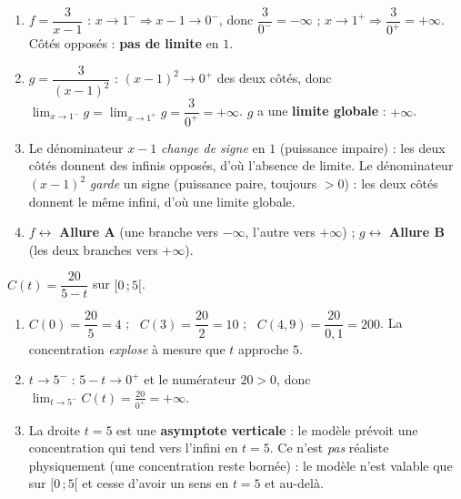 \documentclass[11pt,a4paper]{article}
\begin{document}
\begin{correction}
\begin{enumerate}[label=\alph*),leftmargin=2em,itemsep=3pt]
  \item $f=\dfrac{3}{x-1}$ : $x\to 1^{-}\Rightarrow x-1\to 0^{-}$, donc $\dfrac{3}{0^{-}}=-\infty$ ;
        $x\to 1^{+}\Rightarrow \dfrac{3}{0^{+}}=+\infty$. Côtés opposés : \textbf{pas de limite} en $1$.
  \item $g=\dfrac{3}{(x-1)^2}$ : $(x-1)^2\to 0^{+}$ des deux côtés, donc
        $\displaystyle\lim_{x\to 1^{-}} g=\lim_{x\to 1^{+}} g=\dfrac{3}{0^{+}}=+\infty$. $g$ a une
        \textbf{limite globale} : $+\infty$.
  \item Le dénominateur $x-1$ \emph{change de signe} en $1$ (puissance impaire) : les deux côtés donnent des
        infinis opposés, d'où l'absence de limite. Le dénominateur $(x-1)^2$ \emph{garde} un signe
        (puissance paire, toujours $>0$) : les deux côtés donnent le même infini, d'où une limite globale.
  \item $f\leftrightarrow$ \textbf{Allure A} (une branche vers $-\infty$, l'autre vers $+\infty$) ;
        $g\leftrightarrow$ \textbf{Allure B} (les deux branches vers $+\infty$).
\end{enumerate}
\end{correction}

\begin{correction}
$C(t)=\dfrac{20}{5-t}$ sur $[0\,;5[$.
\begin{enumerate}[label=\alph*),leftmargin=2em,itemsep=3pt]
  \item $C(0)=\dfrac{20}{5}=4$ ; \ $C(3)=\dfrac{20}{2}=10$ ; \ $C(4{,}9)=\dfrac{20}{0{,}1}=200$.
        La concentration \emph{explose} à mesure que $t$ approche $5$.
  \item $t\to 5^{-}$ : $5-t\to 0^{+}$ et le numérateur $20>0$, donc
        $\displaystyle\lim_{t\to 5^{-}} C(t)=\frac{20}{0^{+}}=+\infty$.
  \item La droite $t=5$ est une \textbf{asymptote verticale} : le modèle prévoit une concentration qui
        tend vers l'infini en $t=5$. Ce n'est \emph{pas} réaliste physiquement (une concentration reste
        bornée) : le modèle n'est valable que sur $[0\,;5[$ et cesse d'avoir un sens en $t=5$ et au-delà.
\end{enumerate}
\end{correction}
\end{document}
